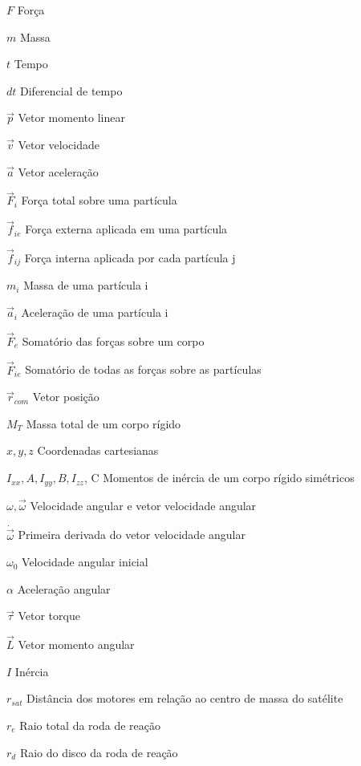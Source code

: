 \begin{simbolos}
  \item[$F$] Força
  \item[$m$] Massa
  \item[$t$] Tempo
  \item[$dt$] Diferencial de tempo
  \item[$\vec{p}$] Vetor momento linear
  \item[$\vec{v}$] Vetor velocidade
  \item[$\vec{a}$] Vetor aceleração
  \item[$\vec{F}_i$] Força total sobre uma partícula
  \item[$\vec{f}_{ie}$] Força externa aplicada em uma partícula
  \item[$\vec{f}_{ij}$] Força interna aplicada por cada partícula j
  \item[$m_i$] Massa de uma partícula i
  \item[$\vec{a}_i$] Aceleração de uma partícula i
  \item[$\vec{F}_e$] Somatório das forças sobre um corpo
  \item[$\vec{F}_{ie}$] Somatório de todas as forças sobre as partículas
  \item[$\vec{r}_{com}$] Vetor posição 
  \item[$M_T$] Massa total de um corpo rígido
  \item[$x,y,z$] Coordenadas cartesianas
  \item[$I_{xx}, A, I_{yy}, B, I_{zz}$, C] Momentos de inércia de um corpo rígido simétricos 
  \item[$\omega,  \vec{\omega}$] Velocidade angular e vetor velocidade angular
  \item[$\dot{\vec{\omega}}$] Primeira derivada do vetor velocidade angular
  \item[$\omega_0$] Velocidade angular inicial
  \item[$\alpha$] Aceleração angular
  \item[$\vec{\tau}$] Vetor torque
  \item[$\vec{L}$] Vetor momento angular
  \item[$I$] Inércia
  \item[$r_{sat}$] Distância dos motores em relação ao centro de massa do satélite
  \item[$r_{e}$] Raio total da roda de reação
  \item[$r_{d}$] Raio do disco da roda de reação

\end{simbolos}
